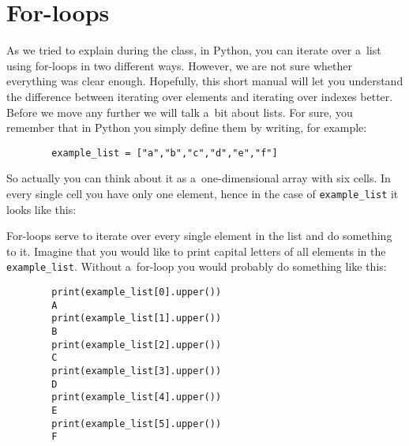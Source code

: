 \documentclass{article}
\begin{document}
\section*{For-loops}
As we tried to explain during the class, in Python, you can iterate over a~list using for-loops in two different ways. However, we are not sure whether everything was clear enough. Hopefully, this short manual will let you understand the difference between iterating over elements and iterating over indexes better. Before we move any further we will talk a~bit about lists. For sure, you remember that in Python you simply define them by writing, for example: 
\begin{center}
    \begin{verbatim}
        example_list = ["a","b","c","d","e","f"]
    \end{verbatim}
\end{center}
    
\noindent So actually you can think about it as a~one-dimensional array with six cells. In every single cell you have only one element, hence in the case of \texttt{example_list} it looks like this:
\begin{center}
\end{center}
\noindent For-loops serve to iterate over every single element in the list and do something to it. Imagine that you would like to print capital letters of all elements in the \texttt{example_list}. Without a~for-loop you would probably do something like this:

\begin{center}
    \begin{verbatim}
        print(example_list[0].upper())
        A
        print(example_list[1].upper())
        B
        print(example_list[2].upper())
        C
        print(example_list[3].upper())
        D
        print(example_list[4].upper())
        E
        print(example_list[5].upper())
        F
    \end{verbatim}
\end{center}
\end{document}
